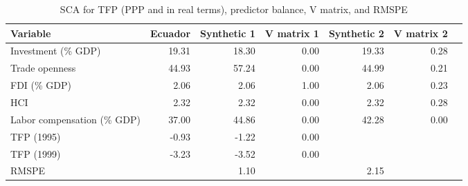 \begin{table}[!htbp]
\begin{center}
\caption{SCA for TFP (PPP and in real terms), predictor balance, V matrix, and RMSPE} \label{table:TFP_balance}
\begin{tabular}{l r r r r r r}     \\ \toprule
  Variable                    &    Ecuador &  Synthetic 1 & V matrix 1 & Synthetic 2 & V matrix 2 \\ \midrule 
  Investment (\% GDP)         &     19.31  &       18.30  &       0.00 &      19.33  &       0.28 \\
  Trade openness              &     44.93  &       57.24  &       0.00 &      44.99  &       0.21 \\ 
  FDI (\% GDP)                &      2.06  &        2.06  &      ~1.00 &       2.06  &       0.23 \\
  HCI                         &      2.32  &        2.32  &       0.00 &       2.32  &       0.28 \\
  Labor compensation (\% GDP) &     37.00  &       44.86  &      ~0.00 &      42.28  &       0.00 \\ \midrule
  TFP (1995)                  &     -0.93  &       -1.22  &      ~0.00 &             &            \\
  TFP (1999)                  &     -3.23  &       -3.52  &       0.00 &             &            \\ \midrule
  RMSPE                       &            &        1.10  &            &       2.15  &            \\
  \bottomrule 
\end{tabular}
\end{center}
\end{table}